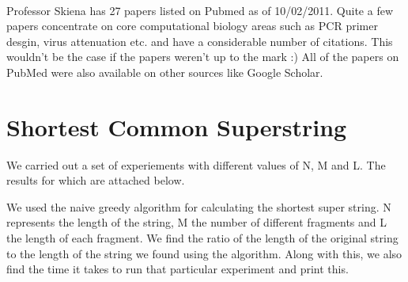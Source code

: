 \documentclass{article}
\begin{document}
\\
Professor Skiena has 27 papers listed on Pubmed as of 10/02/2011. Quite a few papers concentrate on core computational biology areas such as PCR primer desgin, virus attenuation etc. and have a considerable number of citations. This wouldn't be the case if the papers weren't up to the mark :) All of the papers on PubMed were also available on other sources like Google Scholar. 
\clearpage

\section{Shortest Common Superstring}
We carried out a set of experiements with different values of N, M and L. The results for which are attached below. 

We used the naive greedy algorithm for calculating the shortest super string. N represents the length of the string, M the number of different fragments and L the length of each fragment. We find the ratio of the length of the original string to the length of the string we found using the algorithm. Along with this, we also find the time it takes to run that particular experiment and print this. 
\end{document}
